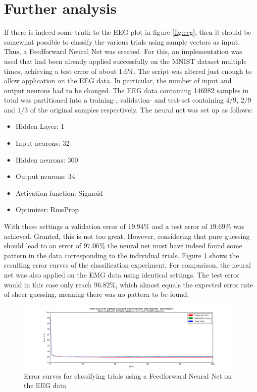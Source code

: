 \documentclass{article} %
\begin{document}
\section{Further analysis}
If there is indeed some truth to the EEG plot in figure \ref{fig:eeg}, then it should be somewhat possible to classify the various trials using sample vectors as input. Thus, a Feedforward Neural Net was created. For this, an implementation was used that had been already applied successfully on the MNIST dataset multiple times, achieving a test error of about $1.6\%$. The script was altered just enough to allow application on the EEG data. In particular, the number of input and output neurons had to be changed. The EEG data containing 146982 samples in total was partitioned into a training-, validation- and test-set containing $4/9$, $2/9$ and $1/3$ of the original samples respectively.
The neural net was set up as follows:
\begin{itemize}
	\item Hidden Layer: 1
	\item Input neurons: 32
	\item Hidden neurons: 300
	\item Output neurons: 34
	\item Activation function: Sigmoid
	\item Optimizer: RmsProp
\end{itemize}
With these settings a validation error of $19.94\%$ and a test error of $19.69\%$ was achieved. Granted, this is not too great. However, considering that pure guessing should lead to an error of $97.06\%$ the neural net must have indeed found some pattern in the data corresponding to the individual trials. Figure \ref{fig:nnerror} shows the resulting error curves of the classification experiment. For comparison, the neural net was also applied on the EMG data using identical settings. The test error would in this case only reach $96.82\%$, which almost equals the expected error rate of sheer guessing, meaning there was no pattern to be found.

\begin{figure}[h]
	\centering
	\hspace*{-1.7cm}
	\includegraphics[width=1.24\textwidth]{nnerror.png}
	\caption{Error curves for classifying trials using a Feedforward Neural Net on the EEG data}
	\label{fig:nnerror}
\end{figure}
\end{document}
